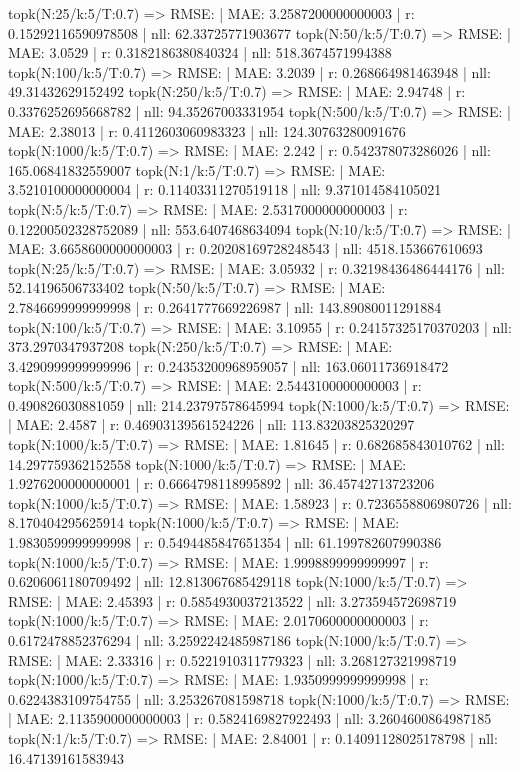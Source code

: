 topk(N:25/k:5/T:0.7) => RMSE: | MAE: 3.2587200000000003 | r: 0.15292116590978508 | nll: 62.33725771903677
topk(N:50/k:5/T:0.7) => RMSE: | MAE: 3.0529 | r: 0.3182186380840324 | nll: 518.3674571994388
topk(N:100/k:5/T:0.7) => RMSE: | MAE: 3.2039 | r: 0.268664981463948 | nll: 49.31432629152492
topk(N:250/k:5/T:0.7) => RMSE: | MAE: 2.94748 | r: 0.3376252695668782 | nll: 94.35267003331954
topk(N:500/k:5/T:0.7) => RMSE: | MAE: 2.38013 | r: 0.4112603060983323 | nll: 124.30763280091676
topk(N:1000/k:5/T:0.7) => RMSE: | MAE: 2.242 | r: 0.542378073286026 | nll: 165.06841832559007
topk(N:1/k:5/T:0.7) => RMSE: | MAE: 3.5210100000000004 | r: 0.11403311270519118 | nll: 9.371014584105021
topk(N:5/k:5/T:0.7) => RMSE: | MAE: 2.5317000000000003 | r: 0.12200502328752089 | nll: 553.6407468634094
topk(N:10/k:5/T:0.7) => RMSE: | MAE: 3.6658600000000003 | r: 0.20208169728248543 | nll: 4518.153667610693
topk(N:25/k:5/T:0.7) => RMSE: | MAE: 3.05932 | r: 0.32198436486444176 | nll: 52.14196506733402
topk(N:50/k:5/T:0.7) => RMSE: | MAE: 2.7846699999999998 | r: 0.2641777669226987 | nll: 143.89080011291884
topk(N:100/k:5/T:0.7) => RMSE: | MAE: 3.10955 | r: 0.24157325170370203 | nll: 373.2970347937208
topk(N:250/k:5/T:0.7) => RMSE: | MAE: 3.4290999999999996 | r: 0.24353200968959057 | nll: 163.06011736918472
topk(N:500/k:5/T:0.7) => RMSE: | MAE: 2.5443100000000003 | r: 0.490826030881059 | nll: 214.23797578645994
topk(N:1000/k:5/T:0.7) => RMSE: | MAE: 2.4587 | r: 0.46903139561524226 | nll: 113.83203825320297
topk(N:1000/k:5/T:0.7) => RMSE: | MAE: 1.81645 | r: 0.682685843010762 | nll: 14.297759362152558
topk(N:1000/k:5/T:0.7) => RMSE: | MAE: 1.9276200000000001 | r: 0.6664798118995892 | nll: 36.45742713723206
topk(N:1000/k:5/T:0.7) => RMSE: | MAE: 1.58923 | r: 0.7236558806980726 | nll: 8.170404295625914
topk(N:1000/k:5/T:0.7) => RMSE: | MAE: 1.9830599999999998 | r: 0.5494485847651354 | nll: 61.199782607990386
topk(N:1000/k:5/T:0.7) => RMSE: | MAE: 1.9998899999999997 | r: 0.6206061180709492 | nll: 12.813067685429118
topk(N:1000/k:5/T:0.7) => RMSE: | MAE: 2.45393 | r: 0.5854930037213522 | nll: 3.273594572698719
topk(N:1000/k:5/T:0.7) => RMSE: | MAE: 2.0170600000000003 | r: 0.6172478852376294 | nll: 3.2592242485987186
topk(N:1000/k:5/T:0.7) => RMSE: | MAE: 2.33316 | r: 0.5221910311779323 | nll: 3.268127321998719
topk(N:1000/k:5/T:0.7) => RMSE: | MAE: 1.9350999999999998 | r: 0.6224383109754755 | nll: 3.253267081598718
topk(N:1000/k:5/T:0.7) => RMSE: | MAE: 2.1135900000000003 | r: 0.5824169827922493 | nll: 3.2604600864987185
topk(N:1/k:5/T:0.7) => RMSE: | MAE: 2.84001 | r: 0.14091128025178798 | nll: 16.47139161583943
